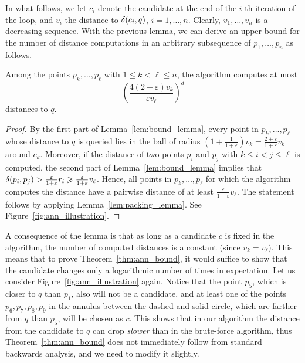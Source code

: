 \documentclass[]{ws-ijcga}
\renewcommand{\leq}{\leqslant}
\renewcommand{\geq}{\geqslant}
\newcommand{\eps}{\varepsilon}
\begin{document}
In what follows, we let $c_i$ denote the candidate
at the end of the $i$-th iteration of the loop, and $v_i$
the distance to $\delta(c_i, q)$, $i = 1, \dots, n$. Clearly, $v_1,\ldots,v_n$ is a decreasing sequence.
With the previous lemma, we can derive an upper bound for the number
of distance computations in an arbitrary subsequence of $p_1,\ldots,p_n$
as follows. 

\begin{lemma}
\label{lem:sequence_lemma}
Among the points $p_k,\ldots,p_\ell$ with $1\leq k< \ell\leq n$, the algorithm computes at most
\[\left(\frac{4(2+\eps) v_k}{\eps v_\ell}\right)^{d}\]
distances to $q$.
\end{lemma}
\begin{proof}
By the first part of Lemma~\ref{lem:bound_lemma}, every point in $p_k,\ldots,p_\ell$
whose distance to $q$ is queried lies in the ball of radius $(1+\frac{1}{1+\eps})v_k=\frac{2+\eps}{1+\eps} v_k$
around $c_k$. Moreover, if the distance of two points $p_i$ and $p_j$ with $k\leq i<j\leq\ell$
is computed, the second part of Lemma~\ref{lem:bound_lemma} implies that $\dist(p_i,p_j)> \frac{\eps}{1+\eps}r_i\geq \frac{\eps}{1+\eps}v_\ell$.
Hence, all points in $p_k,\ldots,p_\ell$ for which the algorithm computes the distance
have a pairwise distance of at least $\frac{\eps}{1+\eps}v_\ell$. The statement follows by applying Lemma~\ref{lem:packing_lemma}.
See Figure~\ref{fig:ann_illustration}.
\end{proof}

A consequence of the lemma is that as long as a candidate $c$ is fixed in the algorithm,
the number of computed distances is a constant (since $v_k=v_\ell$). 
This means that to prove Theorem~\ref{thm:ann_bound}, it would suffice to show
that the candidate changes only a logarithmic number of times in expectation.
Let us consider Figure~\ref{fig:ann_illustration} again. Notice that the point $p_5$, which
is closer to $q$ than $p_1$, also will not be a candidate, and at least one of the points 
$p_6,p_7,p_8,p_9$ in the annulus between the dashed and solid circle, which are farther from 
$q$ than $p_5$, will be chosen as $c$. This shows that in our algorithm the distance from the 
candidate to $q$ can drop \textit{slower} than in the brute-force algorithm, 
thus Theorem~\ref{thm:ann_bound} does not immediately follow from standard backwards analysis,
and we need to modify it slightly.
\end{document}
